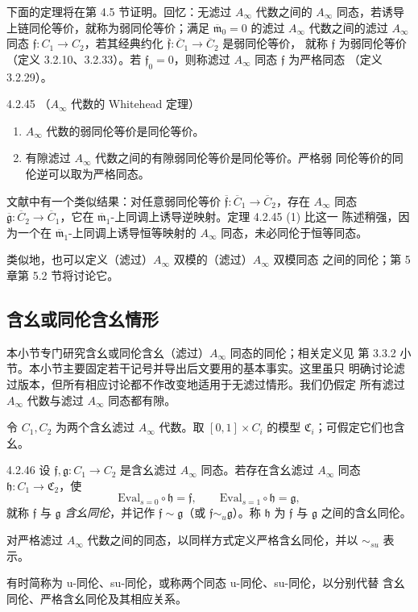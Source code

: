 下面的定理将在第 4.5 节证明。回忆：无滤过 $A_\infty$ 代数之间的
$A_\infty$ 同态，若诱导上链同伦等价，就称为弱同伦等价；满足
$\overline{\mathfrak m}_0=0$ 的滤过 $A_\infty$ 代数之间的滤过
$A_\infty$ 同态 $\mathfrak f\colon C_1\to C_2$，若其经典约化
$\overline{\mathfrak f}\colon\overline C_1\to\overline C_2$ 是弱同伦等价，
就称 $\mathfrak f$ 为弱同伦等价（定义 3.2.10、3.2.33）。若
$\mathfrak f_0=0$，则称滤过 $A_\infty$ 同态 $\mathfrak f$ 为严格同态
（定义 3.2.29）。

\begin{theorem}{4.2.45}\label{thm:4-2-45}
（$A_\infty$ 代数的 Whitehead 定理）
\begin{enumerate}[label=\textup{(\arabic*)},leftmargin=2.8em]
 \item $A_\infty$ 代数的弱同伦等价是同伦等价。
 \item 有隙滤过 $A_\infty$ 代数之间的有隙弱同伦等价是同伦等价。严格弱
 同伦等价的同伦逆可以取为严格同态。
\end{enumerate}
\end{theorem}

文献中有一个类似结果：对任意弱同伦等价
$\overline{\mathfrak f}\colon\overline C_1\to\overline C_2$，存在
$A_\infty$ 同态
$\overline{\mathfrak g}\colon\overline C_2\to\overline C_1$，它在
$\overline{\mathfrak m}_1$-上同调上诱导逆映射。定理 4.2.45 (1) 比这一
陈述稍强，因为一个在 $\overline{\mathfrak m}_1$-上同调上诱导恒等映射的
$A_\infty$ 同态，未必同伦于恒等同态。

类似地，也可以定义（滤过）$A_\infty$ 双模的（滤过）$A_\infty$ 双模同态
之间的同伦；第 5 章第 5.2 节将讨论它。

\subsection{含幺或同伦含幺情形}
\label{subsec:4-2-3}

本小节专门研究含幺或同伦含幺（滤过）$A_\infty$ 同态的同伦；相关定义见
第 3.3.2 小节。本小节主要固定若干记号并导出后文要用的基本事实。这里虽只
明确讨论滤过版本，但所有相应讨论都不作改变地适用于无滤过情形。我们仍假定
所有滤过 $A_\infty$ 代数与滤过 $A_\infty$ 同态都有隙。

令 $C_1,C_2$ 为两个含幺滤过 $A_\infty$ 代数。取
$[0,1]\times C_i$ 的模型 $\mathfrak C_i$；可假定它们也含幺。

\begin{definition}{4.2.46}\label{def:4-2-46}
设 $\mathfrak f,\mathfrak g\colon C_1\to C_2$ 是含幺滤过
$A_\infty$ 同态。若存在含幺滤过 $A_\infty$ 同态
$\mathfrak h\colon C_1\to\mathfrak C_2$，使
\[
 \mathrm{Eval}_{s=0}\circ\mathfrak h=\mathfrak f,
 \qquad
 \mathrm{Eval}_{s=1}\circ\mathfrak h=\mathfrak g,
\]
就称 $\mathfrak f$ 与 $\mathfrak g$ \emph{含幺同伦}，并记作
$\mathfrak f\sim\mathfrak g$（或
$\mathfrak f\sim_u\mathfrak g$）。称 $\mathfrak h$ 为
$\mathfrak f$ 与 $\mathfrak g$ 之间的含幺同伦。

对严格滤过 $A_\infty$ 代数之间的同态，以同样方式定义严格含幺同伦，并以
$\sim_{su}$ 表示。

有时简称为 u-同伦、su-同伦，或称两个同态 u-同伦、su-同伦，以分别代替
含幺同伦、严格含幺同伦及其相应关系。
\end{definition}

